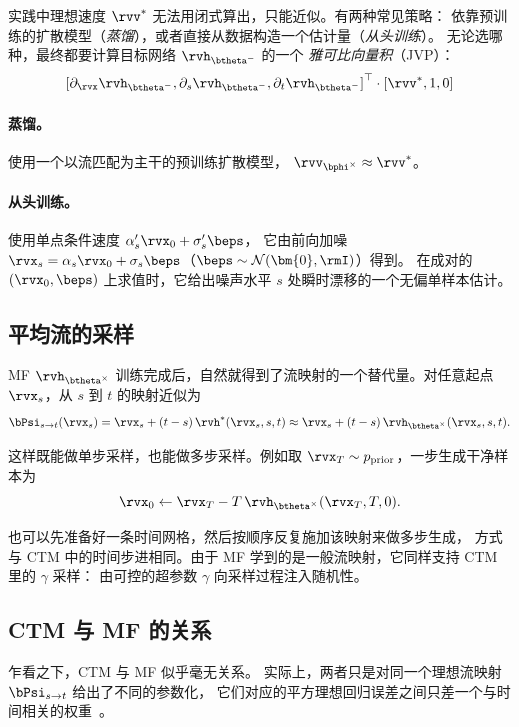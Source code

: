 实践中理想速度 $\rvv^*$ 无法用闭式算出，只能近似。有两种常见策略：
依靠预训练的扩散模型（\emph{蒸馏}），或者直接从数据构造一个估计量（\emph{从头训练}）。
无论选哪种，最终都要计算目标网络 $\rvh_{\btheta^-}$ 的一个
\emph{雅可比向量积}（JVP）：
\[
\left[\partial_\rvx \rvh_{\btheta^-}, \partial_s \rvh_{\btheta^-}, \partial_t \rvh_{\btheta^-}\right]^\top \cdot \left[\rvv^*, 1, 0\right]
\]


\paragraph{蒸馏。}
使用一个以流匹配为主干的预训练扩散模型，
$\rvv_{\bphi^\times} \approx \rvv^*$。

\paragraph{从头训练。}
使用单点条件速度 $\alpha_s'\rvx_0 + \sigma_s'\beps$，
它由前向加噪 $\rvx_s=\alpha_s\rvx_0+\sigma_s\beps$（$\beps\sim\mathcal N(\bm{0},\rmI)$）得到。
在成对的 $(\rvx_0,\beps)$ 上求值时，它给出噪声水平 $s$ 处瞬时漂移的一个无偏单样本估计。


\subsection{平均流的采样}
MF $\rvh_{\btheta^\times}$ 训练完成后，自然就得到了流映射的一个替代量。对任意起点 $\rvx_s$，从 $s$ 到 $t$ 的映射近似为
\[
\bPsi_{s\to t}(\rvx_s) = \rvx_s + (t-s)\,\rvh^*(\rvx_s,s,t)
  \approx   \rvx_s + (t-s)\,\rvh_{\btheta^\times}(\rvx_s,s,t).
\]

这样既能做单步采样，也能做多步采样。例如取
$\rvx_T\sim p_{\mathrm{prior}}$，一步生成干净样本为
\[
\rvx_0  \leftarrow  \rvx_T - T\,\rvh_{\btheta^\times}(\rvx_T,T,0).
\]

也可以先准备好一条时间网格，然后按顺序反复施加该映射来做多步生成，
方式与 CTM 中的时间步进相同。由于 MF 学到的是一般流映射，它同样支持 CTM 里的 $\gamma$ 采样：
由可控的超参数 $\gamma$ 向采样过程注入随机性。

\subsection{CTM 与 MF 的关系}\label{subsec:equivalence-ctm-mf}
乍看之下，CTM 与 MF 似乎毫无关系。
实际上，两者只是对同一个理想流映射 $\bPsi_{s\to t}$ 给出了不同的参数化，
它们对应的平方理想回归误差之间只差一个与时间相关的权重~\citep{hu2025cmt}。

